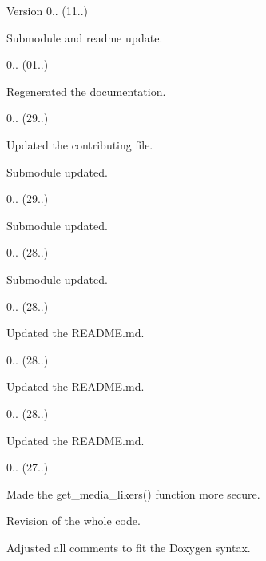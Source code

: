 \begin{DoxyVersion}{Version}
0.. (11..)
\begin{DoxyItemize}
\item Submodule and readme update. 
\end{DoxyItemize}

0.. (01..)
\begin{DoxyItemize}
\item Regenerated the documentation. 
\end{DoxyItemize}

0.. (29..)
\begin{DoxyItemize}
\item Updated the contributing file.
\item Submodule updated. 
\end{DoxyItemize}

0.. (29..)
\begin{DoxyItemize}
\item Submodule updated. 
\end{DoxyItemize}

0.. (28..)
\begin{DoxyItemize}
\item Submodule updated. 
\end{DoxyItemize}

0.. (28..)
\begin{DoxyItemize}
\item Updated the R\+E\+A\+D\+M\+E.\+md. 
\end{DoxyItemize}

0.. (28..)
\begin{DoxyItemize}
\item Updated the R\+E\+A\+D\+M\+E.\+md. 
\end{DoxyItemize}

0.. (28..)
\begin{DoxyItemize}
\item Updated the R\+E\+A\+D\+M\+E.\+md. 
\end{DoxyItemize}

0.. (27..)
\begin{DoxyItemize}
\item Made the get\+\_\+media\+\_\+likers() function more secure.
\item Revision of the whole code.
\item Adjusted all comments to fit the Doxygen syntax. 
\end{DoxyItemize}
\end{DoxyVersion}
